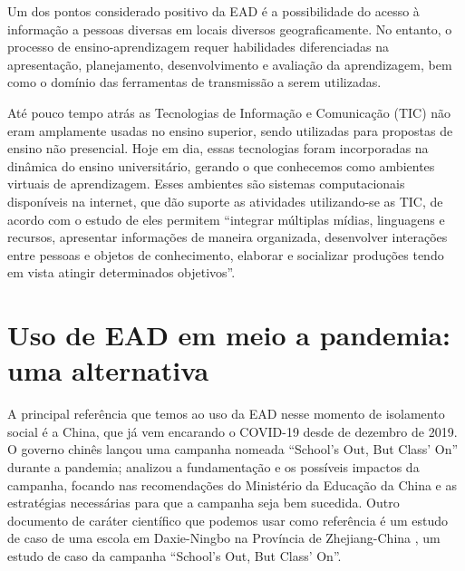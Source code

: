 \documentclass[
	arial,
	12pt,				%
	openright,			%
	oneside,
	a4paper,			%
	chapter=TITLE,		%
	english,			%
	french,				%
	spanish,			%
	brazil,				%
	]{abntex2}
\begin{document}
\begin{citacao}
Um dos pontos considerado positivo da EAD é a possibilidade do acesso à informação a pessoas diversas em locais diversos geograficamente. No entanto, o processo de ensino-aprendizagem requer habilidades diferenciadas na apresentação, planejamento, desenvolvimento e avaliação da aprendizagem, bem como o domínio das ferramentas de transmissão a serem utilizadas. \cite{jorgeEad}
\end{citacao}  

Até pouco tempo atrás as Tecnologias de Informação e Comunicação (TIC) não eram amplamente usadas no ensino superior, sendo utilizadas para propostas de ensino não presencial. Hoje em dia, essas tecnologias foram incorporadas na dinâmica do ensino universitário, gerando o que conhecemos como ambientes virtuais de aprendizagem. Esses ambientes são sistemas computacionais disponíveis na internet, que dão suporte as atividades utilizando-se as TIC, de acordo com o estudo de  eles permitem ``integrar múltiplas mídias, linguagens e recursos, apresentar informações de maneira organizada, desenvolver interações entre pessoas e objetos de conhecimento, elaborar e socializar produções tendo em vista atingir determinados objetivos''.


\section{Uso de EAD em meio a pandemia: uma alternativa}

A principal referência que temos ao uso da EAD nesse momento de isolamento social é a China, que já vem encarando o COVID-19 desde de dezembro de 2019. O governo chinês lançou uma campanha nomeada ``School’s Out, But Class’ On'' durante a pandemia;  analizou a fundamentação e os possíveis impactos da campanha, focando nas recomendações do Ministério da Educação da China e as estratégias necessárias para que a campanha seja bem sucedida. Outro documento de caráter científico que podemos usar como referência é um estudo de caso de uma escola em Daxie-Ningbo na Província de Zhejiang-China \cite{xie2020autonomous}, um estudo de caso da campanha ``School’s Out, But Class’ On''.
\end{document}
